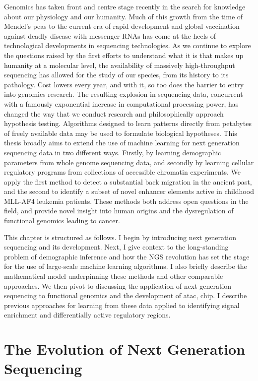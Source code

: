 Genomics has taken front and centre stage recently in the search for knowledge about our physiology and our humanity. Much of this growth from the time of Mendel's peas to the current era of rapid development and global vaccination against deadly disease with messenger RNAs has come at the heels of technological developments in sequencing technologies. As we continue to explore the questions raised by the first efforts to understand what it is that makes up humanity at a molecular level, the availability of massively high-throughput sequencing has allowed for the study of our species, from its history to its pathology. Cost lowers every year, and with it, so too does the barrier to entry into genomics research. The resulting explosion in sequencing data, concurrent with a famously exponential increase in computational processing power, has changed the way that we conduct research and philosophically approach hypothesis testing. Algorithms designed to learn patterns directly from petabytes of freely available data may be used to formulate biological hypotheses. This thesis broadly aims to extend the use of machine learning for next generation sequencing data in two different ways. Firstly, by learning demographic parameters from whole genome sequencing data, and secondly by learning cellular regulatory programs from collections of accessible chromatin experiments. We apply the first method to detect a substantial back migration in the ancient past, and the second to identify a subset of novel enhancer elements active in childhood MLL-AF4 leukemia patients. These methods both address open questions in the field, and provide novel insight into human origins and the dysregulation of functional genomics leading to cancer.

This chapter is structured as follows. I begin by introducing next generation sequencing and its development. Next, I give context to the long-standing problem of demographic inference and how the NGS revolution has set the stage for the use of large-scale machine learning algorithms. I also briefly describe the mathematical model underpinning these methods and other comparable approaches. We then pivot to discussing the application of next generation sequencing to functional genomics and the development of \gls{atac}, \gls{chip}.  I describe previous approaches for learning from these data applied to identifying signal enrichment and differentially active regulatory regions. 


\section{The Evolution of Next Generation Sequencing}

